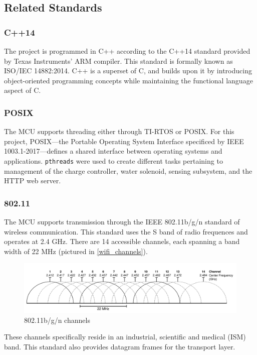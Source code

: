 \subsection{Related Standards}
\subsubsection{C++14} The project is programmed in C++ according to the C++14 standard provided by Texas Instruments' ARM compiler. This standard is formally known as ISO/IEC 14882:2014. C++ is a superset of C, and builds upon it by introducing object-oriented programming concepts while maintaining the functional language aspect of C.

\subsubsection{POSIX} The MCU supports threading either through TI-RTOS or POSIX. For this project, POSIX---the Portable Operating System Interface specificed by IEEE 1003.1-2017---defines a shared interface between operating systems and applications. \texttt{pthreads} were used to create different tasks pertaining to management of the charge controller, water solenoid, sensing subsystem, and the HTTP web server.

\subsubsection{802.11} The MCU supports transmission through the IEEE 802.11b/g/n standard of wireless communication. This standard uses the S band of radio frequences and operates at 2.4 GHz. There are 14 accessible channels, each spanning a band width of 22 MHz (pictured in \autoref{wifi_channels}).
\begin{figure}[H]
    \caption{802.11b/g/n channels \cite{Flickenger}}
    \label{wifi_channels}
    \centering
    \includegraphics[width=\textwidth]{images/wifi_channels.png}
\end{figure}
These channels specifically reside in an industrial, scientific and medical (ISM) band. This standard also provides datagram frames for the transport layer.

